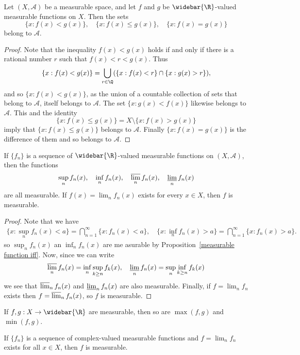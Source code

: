 \begin{proposition}\label{measurable function set f<g}
Let $(X,\mathcal{A})$ be a measurable space, and let $f$ and $g$ be $\widebar{\R}$-valued measurable functions on $X$. Then the sets 
\[\{x:f(x)<g(x)\},\quad\{x:f(x)\leq g(x)\},\quad \{x:f(x)=g(x)\}\]
belong to $\mathcal{A}$.
\end{proposition}
\begin{proof}
Note that the inequality $f(x)<g(x)$ holds if and only if there is a rational number $r$ such that $f(x)<r<g(x)$. Thus
\[\{x:f(x)<g(x)\}=\bigcup_{r\in\Q}(\{x:f(x)<r\}\cap\{x:g(x)>r\}),\]
and so $\{x:f(x)<g(x)\}$, as the union of a countable collection of sets that belong to $\mathcal{A}$, itself belongs to $\mathcal{A}$. The set $\{x:g(x)<f(x)\}$ likewise belongs to $\mathcal{A}$. This and the identity
\[\{x:f(x)\leq g(x)\}=X\setminus\{x:f(x)>g(x)\}\]
imply that $\{x:f(x)\leq g(x)\}$ belongs to $\mathcal{A}$. Finally $\{x:f(x)=g(x)\}$ is the difference of them and so belongs to $\mathcal{A}$.
\end{proof}
\begin{theorem}\label{measurable function limit operation}
If $\{f_n\}$ is a sequence of $\widebar{\R}$-valued measurable functions on $(X,\mathcal{A})$, then the functions
\[\sup_nf_n(x),\quad \inf_nf_n(x),\quad\varlimsup_nf_n(x),\quad\varliminf_nf_n(x)\]
are all measurable. If $f(x)=\lim_nf_n(x)$ exists for every $x\in X$, then $f$ is measurable.
\end{theorem}
\begin{proof} 
Note that we have
\begin{align*}
\{x:\sup_nf_n(x)<a\}=\bigcap_{n=1}^{\infty}\{x:f_n(x)<a\},\quad \{x:\inf_nf_n(x)>a\}=\bigcap_{n=1}^{\infty}\{x:f_n(x)>a\}.
\end{align*}
so $\sup_nf_n(x)$ an $\inf_nf_n(x)$ are me asurable by Proposition~\ref{measurable function iff}. Now, since we can write 
\[\varlimsup_nf_n(x)=\inf_{n}\sup_{k\geq n}f_k(x),\quad \varliminf_nf_n(x)=\sup_{n}\inf_{k\geq n}f_k(x)\]
we see that $\varlimsup_nf_n(x)$ and $\varliminf_nf_n(x)$ are also measurable. Finally, if $f=\lim_nf_n$ exists then $f=\varlimsup_nf_n(x)$, so $f$ is measurable.
\end{proof}
\begin{corollary}\label{measurable function max min}
If $f,g:X\to\widebar{\R}$ are measurable, then so are $\max(f,g)$ and $\min(f,g)$.
\end{corollary}
\begin{corollary}\label{measurable complex function limit}
If $\{f_n\}$ is a sequence of complex-valued measurable functions and $f=\lim_nf_n$ exists for all $x\in X$, then $f$ is measurable.
\end{corollary}
